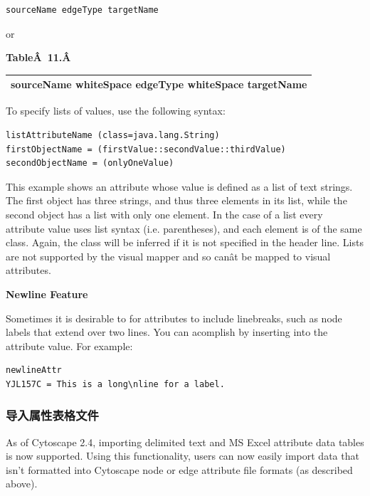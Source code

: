  \begin{verbatim}
sourceName edgeType targetName
\end{verbatim}

 or 

 \textbf{Table\^A 11.\^A }
\begin{tabular}{|c|}
\hline 
 sourceName whiteSpace edgeType whiteSpace targetName \\
\hline 
\end{tabular}

 To specify lists of values, use the following syntax: 

 \begin{verbatim}
listAttributeName (class=java.lang.String)
firstObjectName = (firstValue::secondValue::thirdValue)
secondObjectName = (onlyOneValue)
\end{verbatim}

 This example shows an attribute whose value is defined as a list of text
strings. The first object has three strings, and thus three elements in its
list, while the second object has a list with only one element. In the case of
a list every attribute value uses list syntax (i.e. parentheses), and each
element is of the same class. Again, the class will be inferred if it is not
specified in the header line. Lists are not supported by the visual mapper and
so can\^at be mapped to visual attributes. 

\textbf{Newline Feature}

Sometimes it is desirable to for attributes to include linebreaks, such as node
labels that extend over two lines. You can acomplish by inserting   into the
attribute value. For example: 

 \begin{verbatim}
newlineAttr
YJL157C = This is a long\nline for a label.
\end{verbatim}

\subsubsection{导入属性表格文件}

 As of Cytoscape 2.4, importing delimited text and MS Excel attribute data
tables is now supported. Using this functionality, users can now easily import
data that isn't formatted into Cytoscape node or edge attribute file formats
(as described above). 

